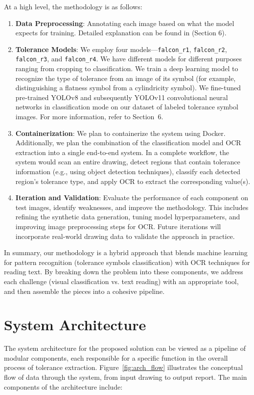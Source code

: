 \documentclass[11pt,a4paper]{article}
\begin{document}
At a high level, the methodology is as follows:
\begin{enumerate}
    \item \textbf{Data Preprocessing}: Annotating each image based on what the model expects for training. Detailed explanation can be found in (Section 6).
    \item \textbf{Tolerance Models}: We employ four models—\texttt{falcon\_r1}, \texttt{falcon\_r2}, \texttt{falcon\_r3}, and \texttt{falcon\_r4}. We have different models for different purposes ranging from cropping to classification. We train a deep learning model to recognize the type of tolerance from an image of its symbol (for example, distinguishing a flatness symbol from a cylindricity symbol). We fine-tuned pre-trained YOLOv8 and subsequently YOLOv11 convolutional neural networks in classification mode on our dataset of labeled tolerance symbol images. For more information, refer to Section~6.
    \item \textbf{Containerization}: We plan to containerize the system using Docker. Additionally, we plan the combination of the classification model and OCR extraction into a single end-to-end system. In a complete workflow, the system would scan an entire drawing, detect regions that contain tolerance information (e.g., using object detection techniques), classify each detected region's tolerance type, and apply OCR to extract the corresponding value(s).
    \item \textbf{Iteration and Validation}: Evaluate the performance of each component on test images, identify weaknesses, and improve the methodology. This includes refining the synthetic data generation, tuning model hyperparameters, and improving image preprocessing steps for OCR. Future iterations will incorporate real-world drawing data to validate the approach in practice.
\end{enumerate}

In summary, our methodology is a hybrid approach that blends machine learning for pattern recognition (tolerance symbols classification) with OCR techniques for reading text. By breaking down the problem into these components, we address each challenge (visual classification vs. text reading) with an appropriate tool, and then assemble the pieces into a cohesive pipeline.

\section{System Architecture}
The system architecture for the proposed solution can be viewed as a pipeline of modular components, each responsible for a specific function in the overall process of tolerance extraction. Figure~\ref{fig:arch_flow} illustrates the conceptual flow of data through the system, from input drawing to output report. The main components of the architecture include:
\end{document}
